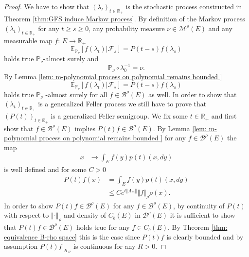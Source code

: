 \documentclass[a4paper,12pt]{article}
\theoremstyle{definition}
\theoremstyle{remark}
\numberwithin{equation}{section}
\numberwithin{theorem}{section}
\begin{document}
\begin{proof}
We have to show that $\left(\lambda_{t}\right)_{t\in\mathbb{R}_{+}}$
is the stochastic process constructed in Theorem \ref{thm:GFS induce Markov process}.
By definition of the Markov process $\left(\lambda_{t}\right)_{t\in\mathbb{R}_{+}}$
for any $t\geq s\geq0$, any probability measure  $\nu\in\mathcal{M}^{\rho}(E)$ and any measurable map $f:\,E\rightarrow\mathbb{\mathbb{R}}_{+}$
\begin{equation}
\mathbb{E}_{\mathbb{P}_{\nu}}\left[\left.f(\lambda_{t})\right|\mathcal{F}_{s}\right]=P\left(t-s\right)f(\lambda_{s})
\end{equation}
holds true $\mathbb{P}_{\nu}$-almost surely and 
\[
\mathbb{\mathbb{P}_{\nu}}\circ\lambda_{0}^{-1}=\nu.
\]
By Lemma \ref{lem: m-polynomial process on polynomial remains bounded }
\[
\mathbb{E}_{\mathbb{P}_{\nu}}\left[\left.f(\lambda_{t})\right|\mathcal{F}_{s}\right]=P\left(t-s\right)f(\lambda_{s})
\]
holds true $\mathbb{P}_{\nu}$ -almost surely for all $f\in\mathscr{B}^{\rho}(E)$
as well. In order to show that $\left(\lambda_{t}\right)_{t\in\mathbb{R}_{+}}$
is a generalized Feller process we still have to prove that $\left(P(t)\right)_{t\in\mathbb{R}_{+}}$
is a generalized Feller semigroup. We fix some $t\in\mathbb{R}_{+}$
and first show that $f\in\mathcal{\mathscr{B}}^{\rho}(E)$ implies
$P\left(t\right)f\in\mathcal{\mathscr{B}}^{\rho}(E)$. By Lemma \ref{lem: m-polynomial process on polynomial remains bounded }
for any $f \in \mathcal{\mathscr{B}}^{\rho}(E)$
the map
\begin{align*}
x & \rightarrow\int_{E}f(y)p(t)(x,dy)
\end{align*}
is well defined and for some $C>0$
\begin{align*}
P\left(t\right)f(x) & =\int_{E}f(y)p(t)(x,dy)\\
 & \leq C e^{t\left\Vert A_{m}\right\Vert }\left\Vert f \right\Vert_{\rho} \rho(x).
\end{align*}
In order to show $P\left(t\right)f\in\mathcal{\mathscr{B}}^{\rho}(E)$
for any $f\in\mathcal{\mathscr{B}}^{\rho}(E)$, by continuity of $P\left(t\right)$
with respect to $\left\Vert \cdot\right\Vert _{\rho}$ and density
of $C_{b}(E)$ in $\mathcal{\mathscr{B}}^{\rho}(E)$ it is sufficient
to show that $P\left(t\right)f\in\mathcal{\mathscr{B}}^{\rho}(E)$
holds true for any $f\in C_{b}(E)$. By Theorem \ref{thm: equivalence B-rho space}
this is the case since $P(t)f$ is clearly bounded and by assumption
$\left.P(t)f\right|_{K_{R}}$ is continuous for any $R>0$. 


\end{proof}
\end{document}
